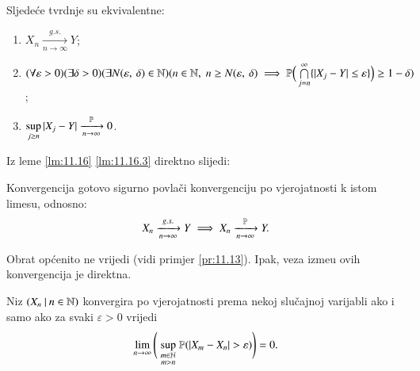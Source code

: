 \begin{lm}  \label{lm:11.16}
    Sljede\' ce tvrdnje su ekvivalentne:
    \begin{enumerate}[label=(\roman*)]
        \item $X_n \xrightarrow[n \to \infty]{g.s.} Y$;
        \item $(\forall \varepsilon > 0)(\exists \delta > 0) (\exists N ({\varepsilon}, \: {\delta}) \in \mathbb{N})\\
        (n \in \mathbb{N}, \; n \geq N ({\varepsilon}, \: {\delta}) \implies \mathbb{P} \Big( \bigcap\limits_{j = n}^{\infty} \{ |X_j - Y| \leq \varepsilon \} \Big) \geq 1 - \delta)$;
        \item   \label{lm:11.16.3}
        $\sup\limits_{j \geq n} |X_j - Y| \xrightarrow[n  \to \infty]{\mathbb{P}} 0$.
    \end{enumerate}
\end{lm}
 Iz leme \ref{lm:11.16} \ref{lm:11.16.3} direktno slijedi:

\begin{kor}    \label{kor:11.17}
    Konvergencija gotovo sigurno povla\v ci konvergenciju po vjerojatnosti k istom limesu, odnosno:
    \begin{equation*}
        X_n \xrightarrow[n \to \infty]{g.s.} Y \implies X_n \xrightarrow[n \to \infty]{\mathbb{P}} Y.
    \end{equation*}
\end{kor}

Obrat op\' cenito ne vrijedi (vidi primjer \ref{pr:11.13}).
Ipak, veza izme\dj u ovih konvergencija je direktna.
 
\begin{lm} \label{lm:11.18}
    Niz $({X_n} \: | \: {n \in \mathbb{N}})$ konvergira po vjerojatnosti prema nekoj slu\v cajnoj varijabli ako i samo ako za svaki $\varepsilon > 0$ vrijedi
    \begin{equation*}
        \lim\limits_{n \to \infty} \Bigg( \sup\limits_{
            \begin{smallmatrix}
               m \in \mathbb{N}\\
               m > n
            \end{smallmatrix}
        }  \mathbb{P}({ |X_m - X_n| > \varepsilon })\Bigg) = 0.
    \end{equation*}
\end{lm}

